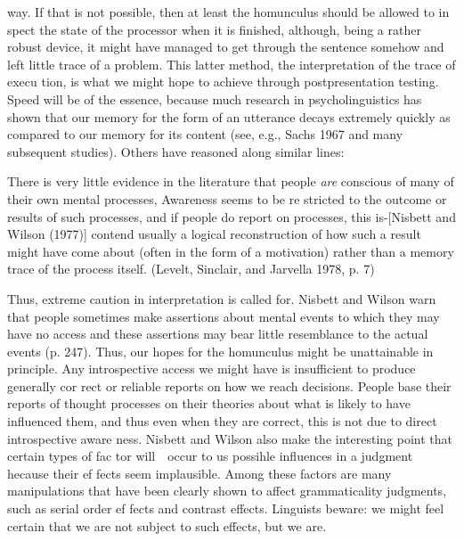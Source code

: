 \clearpage\setcounter{page}{1}\begin{styleStandard}
way. If that is not possible, then at least the homunculus should be allowed to in\- spect the state of the processor when it is finished, although, being a rather robust device, it might have managed to get through the sentence somehow and left little trace of a problem. This latter method, the interpretation of the {\textquotedbl}trace of execu\- tion,{\textquotedbl} is what we might hope to achieve through postpresentation testing. Speed will be of the essence, because much research in psycholinguistics has shown that our memory for the form of an utterance decays extremely quickly as compared to our memory for its content (see, e.g., Sachs 1967 and many subsequent studies). Others have reasoned along similar lines:
\end{styleStandard}


\begin{styleStandard}
There is very little evidence in the literature that people \textit{are}\textit{ }conscious of many of their own mental processes, Awareness seems to be re\- stricted to the outcome or results of such processes, and if people do report on processes, this is-[Nisbett and Wilson (1977)] contend\- usually a logical reconstruction of how such a result might have come about (often in the form of a motivation) rather than a memory trace of the process itself. (Levelt, Sinclair, and Jarvella 1978, p. 7)
\end{styleStandard}


\begin{styleStandard}
Thus, extreme caution in interpretation is called for. Nisbett and Wilson warn that {\textquotedbl}people sometimes make assertions about mental events to which they may have no access and these assertions may bear little resemblance to the actual events{\textquotedbl} (p. 247). Thus, our hopes for the homunculus might be unattainable in principle. Any introspective access we might have is insufficient to produce generally cor\- rect or reliable reports on how we reach decisions. People base their reports of thought processes on their theories about what is likely to have influenced them, and thus even when they are correct, this is not due to direct introspective aware\- ness. Nisbett and Wilson also make the interesting point that certain types of fac\- tor will\ \ occur to us possihle influences in a judgment hecause their ef\- fects seem implausible. Among these factors are many manipulations that have been clearly shown to affect grammaticality judgments, such as serial order ef\- fects and contrast effects. Linguists beware: we might feel certain that we are not subject to such effects, but we are.
\end{styleStandard}


